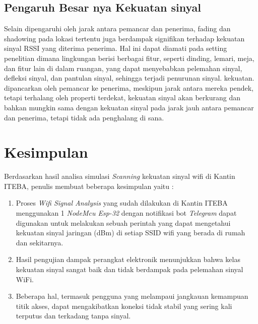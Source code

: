 \documentclass[conference]{IEEEtran}
\begin{document}
        \subsection{Pengaruh Besar nya Kekuatan sinyal}
Selain dipengaruhi oleh jarak antara pemancar dan penerima, fading dan shadowing pada lokasi tertentu juga berdampak signifikan terhadap kekuatan sinyal RSSI yang diterima penerima. Hal ini dapat diamati pada setting penelitian dimana lingkungan berisi berbagai fitur, seperti dinding, lemari, meja, dan fitur lain di dalam ruangan, yang dapat menyebabkan pelemahan sinyal, defleksi sinyal, dan pantulan sinyal, sehingga terjadi penurunan sinyal. kekuatan. dipancarkan oleh pemancar ke penerima, meskipun jarak antara mereka pendek, tetapi terhalang oleh properti terdekat, kekuatan sinyal akan berkurang dan bahkan mungkin sama dengan kekuatan sinyal pada jarak jauh antara pemancar dan penerima, tetapi tidak ada penghalang di sana.

\section{Kesimpulan}

Berdasarkan hasil analisa simulasi \textit{Scanning} kekuatan sinyal wifi di Kantin ITEBA, penulis membuat beberapa kesimpulan yaitu :
\begin{enumerate}
    \item Proses \textit{Wifi Signal Analysis} yang sudah dilakukan di Kantin ITEBA menggunakan 1 \textit{NodeMcu Esp-32} dengan notifikasi bot \textit{Telegram} dapat digunakan untuk melakukan sebuah perintah yang dapat mengetahui kekuatan sinyal jaringan (dBm)
    di setiap SSID wifi yang berada di rumah dan sekitarnya.
    \item Hasil pengujian dampak perangkat elektronik menunjukkan bahwa kelas kekuatan sinyal sangat baik dan tidak berdampak pada pelemahan sinyal WiFi.
   \item Beberapa hal, termasuk pengguna yang melampaui jangkauan kemampuan titik akses, dapat mengakibatkan koneksi tidak stabil yang sering kali terputus dan terkadang tanpa sinyal.
\end{enumerate}
\end{document}
